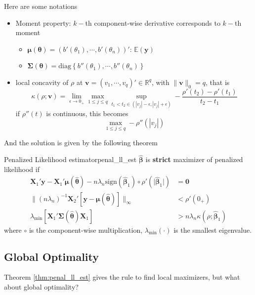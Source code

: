 \documentclass[twoside]{article}
\begin{document}
Here are some notations
\begin{itemize}
    \item Moment property: $k-$th component-wise derivative corresponds to $k-$th moment
    \begin{itemize}
        \item $\boldsymbol{\mu}(\boldsymbol{\theta}) = (b'(\theta_1),\cdots,b'(\theta_n))'$: $\mathbb{E}(\mathbf{y})$
        \item $\boldsymbol{\Sigma}(\boldsymbol{\theta}) = \mathrm{diag}\left\{ b''(\theta_1),\cdots,b''(\theta_n) \right\} $
    \end{itemize}
    \item local concavity of $\rho$ at $\mathbf{v}=(v_1,\cdots,v_q)'\in\mathbb{R}^q$, with $\lVert \mathbf{v} \rVert _0 = q$, that is 
    $$ 
    \kappa(\rho;\mathbf{v}) = \lim_{\epsilon\rightarrow 0_+} \max_{1\leq j\leq q} \sup_{t_1<t_2\in (|v_j|-\epsilon,|v_j|+\epsilon)} - \frac{\rho'(t_2)-\rho'(t_1)}{t_2-t_1}
    $$
    if $\rho''(t)$ is continuous, this becomes
    $$
    \max_{1\leq j\leq q} -\rho''(|v_j|)
    $$
\end{itemize}
And the solution is given by the following theorem 
\begin{theorem}{Penalized Likelihood estimator}{penal_ll_est}
    $\hat{\boldsymbol{\beta}}$ is \textbf{strict } maximizer of penalized likelihood if
    \begin{align*}
        \mathbf{X}_1'\mathbf{y} - \mathbf{X}_1'\boldsymbol{\mu}(\boldsymbol{\hat{\theta}})-n\lambda_n \mathrm{sign}(\hat{\boldsymbol{\beta}}_1)\circ \rho'(\lvert \hat{\boldsymbol{\beta}}_1 \rvert) &= \mathbf{0} \\
        \lVert (n\lambda_n)^{-1}\mathbf{X}_2'[\mathbf{y}-\boldsymbol{\mu}(\hat{\boldsymbol{\theta}})] \rVert _{\infty} &< \rho'(0_+) \\
        \lambda_{\min}\left[\mathbf{X}_1'\boldsymbol{\Sigma}(\hat{\boldsymbol{\theta}})\mathbf{X}_1\right] &> n\lambda_n \kappa(\rho;\hat{\boldsymbol{\beta}}_1)
    \end{align*}
    where $\circ$ is the component-wise multiplication, $\lambda_{\min}(\cdot)$ is the smallest eigenvalue.
\end{theorem}

\subsection{Global Optimality}
Theorem \ref{thm:penal_ll_est} gives the rule to find local maximizers, but what about global optimality?
\end{document}

